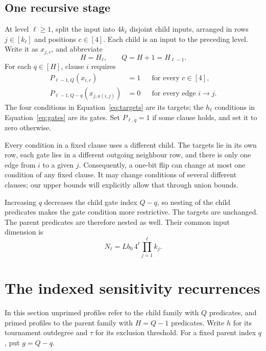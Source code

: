 \documentclass[11pt]{article}
\theoremstyle{definition}
\theoremstyle{remark}
\begin{document}
\subsection{One recursive stage}

At level $\ell\ge1$, split the input into $4k_\ell$ disjoint child
inputs, arranged in rows $j\in[k_\ell]$ and positions $c\in[4]$.
Each child is an input to the preceding level.  Write it as $x_{j,c}$,
and abbreviate
\[
                 H=H_\ell,\qquad Q=H+1=H_{\ell-1}.
\]
For each $q\in[H]$, clause $i$ requires
\begin{align}
 P_{\ell-1,Q}(x_{i,c})&=1
                 &&\text{for every }c\in[4],
 \label{eq:targets}\\
 P_{\ell-1,Q-q}(x_{j,a(i,j)})&=0
                 &&\text{for every edge }i\to j.
 \label{eq:gates}
\end{align}
The four conditions in Equation~\eqref{eq:targets} are its targets;
the $h_\ell$ conditions in Equation~\eqref{eq:gates} are its gates.
Set $P_{\ell,q}=1$ if some clause holds, and set it to zero otherwise.

Every condition in a fixed clause uses a different child.  The targets
lie in its own row, each gate lies in a different outgoing neighbour
row, and there is only one edge from $i$ to a given $j$.  Consequently,
a one-bit flip can change at most one condition of any fixed clause.
It may change conditions of several different clauses; our upper bounds
will explicitly allow that through union bounds.

Increasing $q$ decreases the child gate index $Q-q$, so nesting of the
child predicates makes the gate condition more restrictive.  The
targets are unchanged.  The parent predicates are therefore nested as
well.  Their common input dimension is
\begin{equation}
 N_\ell=Lb_0\,4^\ell\prod_{j=1}^\ell k_j.
 \label{eq:recursive-dimension}
\end{equation}

\section{The indexed sensitivity recurrences}
\label{sec:recurrences}

In this section unprimed profiles refer to the child family with $Q$
predicates, and primed profiles to the parent family with $H=Q-1$
predicates.  Write $h$ for its tournament outdegree and $\tau$ for its
exclusion threshold.  For a fixed parent index $q$, put $g=Q-q$.
\end{document}
